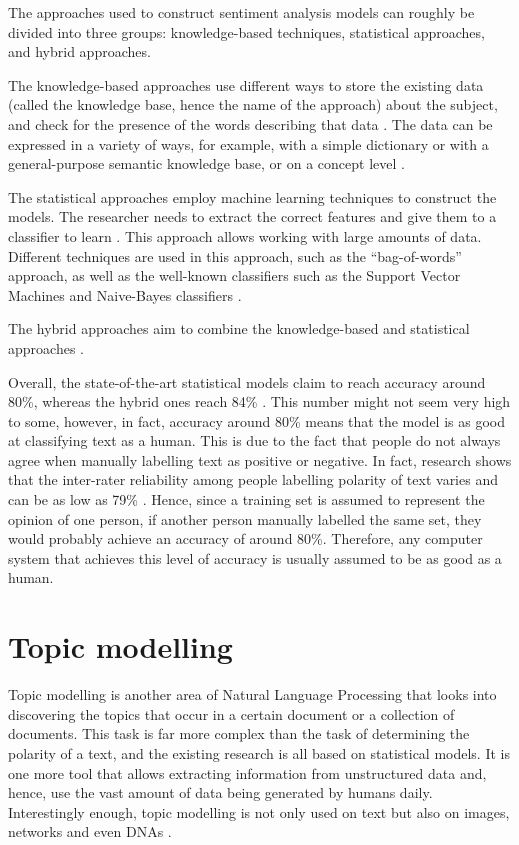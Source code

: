 The approaches used to construct sentiment analysis models can roughly be divided into three groups: knowledge-based techniques, statistical approaches, and hybrid approaches. 

The knowledge-based approaches use different ways to store the existing data (called the knowledge base, hence the name of the approach) about the subject, and check for the presence of the words describing that data \cite{chaumartin2007upar7}. The data can be expressed in a variety of ways, for example, with a simple dictionary or with a general-purpose semantic knowledge base, or on a concept level \cite{cambria2013knowledge}. 

The statistical approaches employ machine learning techniques to construct the models. The researcher needs to extract the correct features and give them to a classifier to learn \cite{cambria2013statistical}. This approach allows working with large amounts of data. Different techniques are used in this approach, such as the ``bag-of-words'' approach, as well as the well-known classifiers such as the Support Vector Machines and Naive-Bayes classifiers \cite{mullen2004sentiment, tan2009adapting}.

The hybrid approaches aim to combine the knowledge-based and statistical approaches \cite{ghiassi2013twitter}. 

Overall, the state-of-the-art statistical models claim to reach accuracy around 80\%, whereas the hybrid ones reach 84\% \cite{thakkar2015approaches}. This number might not seem very high to some, however, in fact, accuracy around 80\% means that the model is as good at classifying text as a human. This is due to the fact that people do not always agree when manually labelling text as positive or negative. In fact, research shows that the inter-rater reliability among people labelling polarity of text varies and can be as low as 79\% \cite{bloom2007extracting}. Hence, since a training set is assumed to represent the opinion of one person, if another person manually labelled the same set, they would probably achieve an accuracy of around 80\%. Therefore, any computer system that achieves this level of accuracy is usually assumed to be as good as a human.

\section{Topic modelling}
\label{sec:topic_modelling}

Topic modelling is another area of Natural Language Processing that looks into discovering the topics that occur in a certain document or a collection of documents. This task is far more complex than the task of determining the polarity of a text, and the existing research is all based on statistical models. It is one more tool that allows extracting information from unstructured data and, hence, use the vast amount of data being generated by humans daily. Interestingly enough, topic modelling is not only used on text but also on images, networks and even DNAs \cite{liu2007unsupervised, chang2009relational, lau2013collocations}. 

